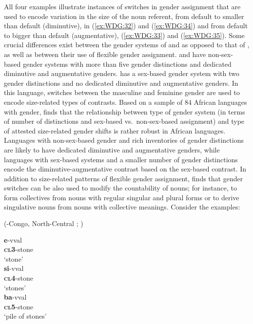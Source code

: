 \documentclass[output=collectionpaper]{langsci/langscibook}
\begin{document}
All four examples illustrate instances of switches in gender assignment that are used to encode variation in the size of the noun referent, from default to smaller than default (diminutive), in (\ref{ex:WDG:32}) and (\ref{ex:WDG:34}) and from default to bigger than default (augmentative), (\ref{ex:WDG:33}) and (\ref{ex:WDG:35}). Some crucial differences exist between the gender systems of  and  as opposed to that of , as well as between their use of flexible gender assignment.  and  have non-sex-based gender systems with more than five gender distinctions and dedicated diminutive and augmentative genders.  has a sex-based gender system with two gender distinctions and no dedicated diminutive and augmentative genders. In this language, switches between the masculine and feminine gender are used to encode size-related types of contrasts. Based on a sample of 84 African languages with gender, \cite{DiGarbo2014} finds that the relationship between type of gender system (in terms of number of distinctions and sex-based vs.\ non-sex-based assignment) and type of attested size-related gender shifts is rather robust in African languages. Languages with non-sex-based gender and rich inventories of gender distinctions are likely to have dedicated diminutive and augmentative genders, while languages with sex-based systems and a smaller number of gender distinctions encode the diminutive-augmentative contrast based on the sex-based contrast. In addition to size-related patterns of flexible gender assignment, \cite{DiGarbo2014} finds that gender switches can be also used to modify the countability of nouns; for instance, to form collectives from nouns with regular singular and plural forms or to derive singulative nouns from nouns with collective meanings. Consider the examples:

\ea\label{ex:WDG:36}
 (-Congo, North-Central ; \citealt[243]{Sagna2011}) \\
\begin{xlist}
\ex
\gll	\textbf{e}-vval \\
	\textbf{\textsc{cl}3}-stone \\
\glt	`stone' \\
\ex
\gll	\textbf{si}-vval \\
	\textbf{\textsc{cl}4}-stone \\
\glt	`stones'\\
\ex
\gll 	\textbf{ba}-vval \\
	\textbf{\textsc{cl}5}-stone \\
\glt	`pile of stones' \\
\end{xlist}
\z
\end{document}
